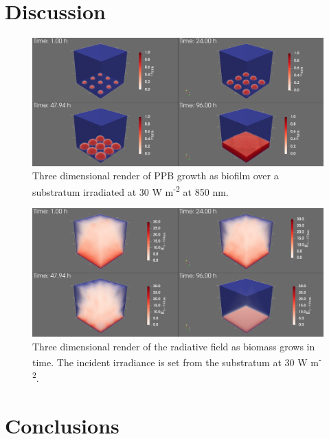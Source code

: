 \section{Discussion}

\begin{figure}[tp]
    \centering
    \includegraphics[width=\textwidth,height=0.4\textheight]{Chap4/results/xpb_alpha_volumeRender.png}
    \caption{Three dimensional render of PPB growth as biofilm over a substratum irradiated at 30 W m\textsuperscript{-2} at 850 nm. } 
    \label{fig:3d_below_ppb}
\end{figure}




\begin{figure}[tp]
    \centering
    \includegraphics[width=\textwidth,height=0.4\textheight]{Chap4/results/E850_below_3d.png}
    \caption{Three dimensional render of the radiative field as biomass grows in time. The incident irradiance is set from the substratum at 30 W m\textsuperscript{-2}. } 
    \label{fig:3d_below_rad}
\end{figure}












\section{Conclusions}
